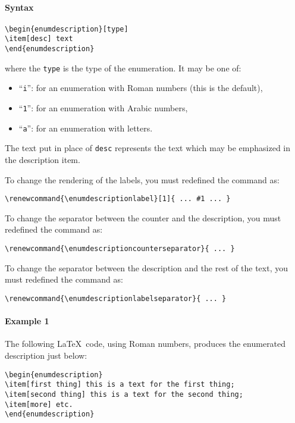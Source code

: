 \documentclass[book,taskpackage,specpackage,codepackage]{upmethodology-document}
\begin{document}
\paragraph{Syntax}
\begin{verbatim}
\begin{enumdescription}[type]
\item[desc] text
\end{enumdescription}
\end{verbatim}
where the \texttt{type} is the type of the enumeration. It may be one of:
\begin{itemize}
\item ``\texttt{i}'': for an enumeration with Roman numbers (this is the default),
\item ``\texttt{1}'': for an enumeration with Arabic numbers,
\item ``\texttt{a}'': for an enumeration with letters.
\end{itemize}
The text put in place of \texttt{desc} represents the text which may be emphasized in the description item.


To change the rendering of the labels, you must redefined the command as:
\begin{verbatim}
\renewcommand{\enumdescriptionlabel}[1]{ ... #1 ... }
\end{verbatim}

To change the separator between the counter and the description, you must redefined the command as:
\begin{verbatim}
\renewcommand{\enumdescriptioncounterseparator}{ ... }
\end{verbatim}

To change the separator between the description and the rest of the text, you must redefined the command as:
\begin{verbatim}
\renewcommand{\enumdescriptionlabelseparator}{ ... }
\end{verbatim}

\paragraph{Example 1} The following \LaTeX~code, using Roman numbers, produces the enumerated description just below:
\begin{verbatim}
\begin{enumdescription}
\item[first thing] this is a text for the first thing;
\item[second thing] this is a text for the second thing;
\item[more] etc.
\end{enumdescription}
\end{verbatim}
\end{document}
